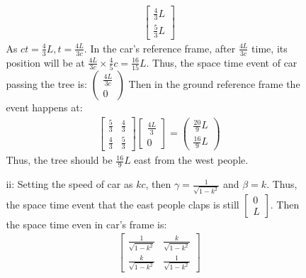 \documentclass{article}
\begin{document}
\begin{itemize}
\begin{itemize}
\begin{itemize}
\begin{align*}
\begin{bmatrix}
                    \frac{4}{3}L \\ \frac{5}{3}L
                \end{bmatrix}
            \end{align*}
            As \(ct = \frac{4}{3}L, t = \frac{4L}{3c}\).
            In the car's reference frame, after \(\frac{4L}{3c}\) time, its position will be at \(\frac{4L}{3c}\times \frac{4}{5}c = \frac{16}{15}L\).
            Thus, the space time event of car passing the tree is: \(\begin{pmatrix}
                \frac{4L}{3c}\\ 0
            \end{pmatrix}\)
            Then in the ground reference frame the event happens at:
            \begin{align*}
                \begin{bmatrix}
                    \frac{5}{3}&\frac{4}{3}\\\frac{4}{3}&\frac{5}{3}
                \end{bmatrix}
                \begin{bmatrix}
                    \frac{4L}{3}\\ 0
                \end{bmatrix}=
                \begin{pmatrix}
                    \frac{20}{9}L\\ \frac{16}{9}L
                \end{pmatrix}
            \end{align*}
            Thus, the tree should be \(\frac{16}{9}L\) east from the west people.
            \item [ii:] Setting the speed of car as \(kc\), then \(\gamma = \frac{1}{\sqrt{1-k^2}}\) and \(\beta = k\).
                        Thus, the space time event that the east people claps is still \(\begin{bmatrix}
                        0\\L
                        \end{bmatrix}\). Then the space time even in car's frame is:
                        \begin{align*}
                            \begin{bmatrix}
                                \frac{1}{\sqrt{1-k^2}}&\frac{k}{\sqrt{1-k^2}}\\
                                \frac{k}{\sqrt{1-k^2}}&\frac{1}{\sqrt{1-k^2}}
                            \end{bmatrix}

\end{align*}
\end{itemize}
\end{itemize}
\end{itemize}
\end{document}
